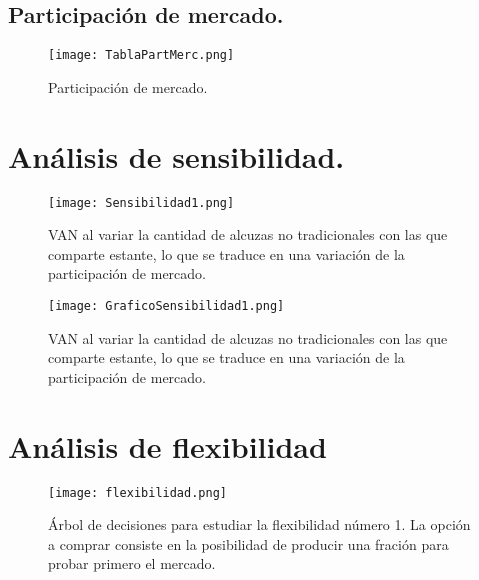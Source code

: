 \newpage
\subsection{Participación de mercado.}
 \label{PartMerc}
  \begin{figure}[H]
    \label{TablaPartMerc}
    \centering
    \texttt{[image: TablaPartMerc.png]}
    \caption{Participación de mercado.}
  \end{figure}


\section{Análisis de sensibilidad.}
\label{AnSensibilidad1}
  \begin{figure}[H]
  \centering
  \texttt{[image: Sensibilidad1.png]}
  \caption{VAN al variar la cantidad de alcuzas no tradicionales con las que comparte estante, lo que se traduce en una variación de la participación de mercado.}
  \label{Sensibilidad1}
  \end{figure}

\begin{figure}[H]
\centering
\texttt{[image: GraficoSensibilidad1.png]}
\caption{VAN al variar la cantidad de alcuzas no tradicionales con las que comparte estante, lo que se traduce en una variación de la participación de mercado.}
\label{GraficoSensibilidad1}
\end{figure}

\section{Análisis de flexibilidad}
\begin{figure}[H]
\centering
\texttt{[image: flexibilidad.png]}
\caption{Árbol de decisiones para estudiar la flexibilidad número 1. La opción a comprar consiste en la posibilidad de producir una fración para probar primero el mercado.}
\label{flexibilidad}
\end{figure}
